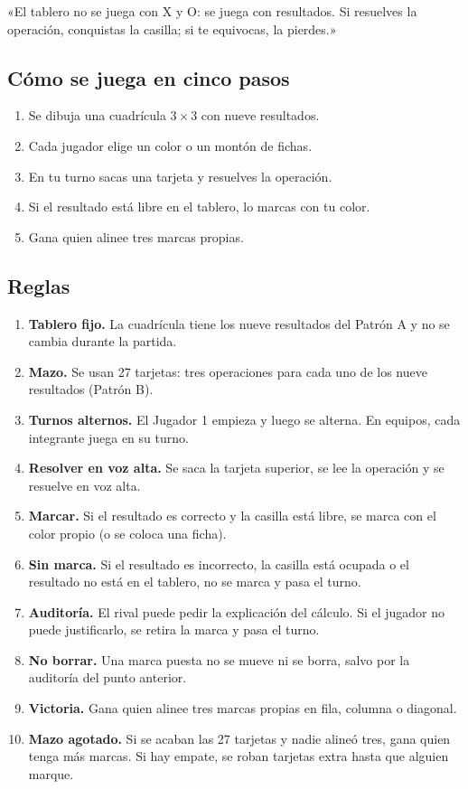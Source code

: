 \documentclass[12pt, letterpaper]{article}
\begin{document}
\begin{cuadroextra}
  «El tablero no se juega con X y O: se juega con resultados. Si resuelves la operación, conquistas la casilla; si te equivocas, la pierdes.»
\end{cuadroextra}

\subsection{Cómo se juega en cinco pasos}

\begin{enumerate}[leftmargin=*]
  \item Se dibuja una cuadrícula $3\times 3$ con nueve resultados.
  \item Cada jugador elige un color o un montón de fichas.
  \item En tu turno sacas una tarjeta y resuelves la operación.
  \item Si el resultado está libre en el tablero, lo marcas con tu color.
  \item Gana quien alinee tres marcas propias.
\end{enumerate}

\subsection{Reglas}

\begin{enumerate}[leftmargin=*]
  \item \textbf{Tablero fijo.} La cuadrícula tiene los nueve resultados del Patrón A y no se cambia durante la partida.
  \item \textbf{Mazo.} Se usan 27 tarjetas: tres operaciones para cada uno de los nueve resultados (Patrón B).
  \item \textbf{Turnos alternos.} El Jugador 1 empieza y luego se alterna. En equipos, cada integrante juega en su turno.
  \item \textbf{Resolver en voz alta.} Se saca la tarjeta superior, se lee la operación y se resuelve en voz alta.
  \item \textbf{Marcar.} Si el resultado es correcto y la casilla está libre, se marca con el color propio (o se coloca una ficha).
  \item \textbf{Sin marca.} Si el resultado es incorrecto, la casilla está ocupada o el resultado no está en el tablero, no se marca y pasa el turno.
  \item \textbf{Auditoría.} El rival puede pedir la explicación del cálculo. Si el jugador no puede justificarlo, se retira la marca y pasa el turno.
  \item \textbf{No borrar.} Una marca puesta no se mueve ni se borra, salvo por la auditoría del punto anterior.
  \item \textbf{Victoria.} Gana quien alinee tres marcas propias en fila, columna o diagonal.
  \item \textbf{Mazo agotado.} Si se acaban las 27 tarjetas y nadie alineó tres, gana quien tenga más marcas. Si hay empate, se roban tarjetas extra hasta que alguien marque.
\end{enumerate}
\end{document}
